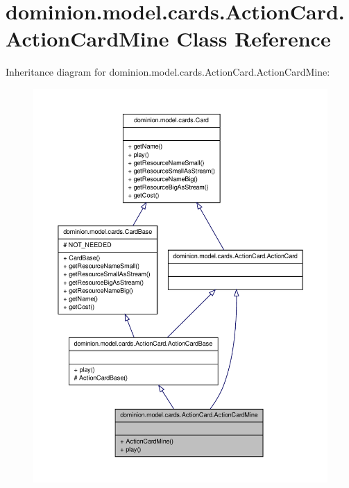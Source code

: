 \hypertarget{classdominion_1_1model_1_1cards_1_1ActionCard_1_1ActionCardMine}{\section{dominion.\-model.\-cards.\-Action\-Card.\-Action\-Card\-Mine \-Class \-Reference}
\label{classdominion_1_1model_1_1cards_1_1ActionCard_1_1ActionCardMine}
}


\-Inheritance diagram for dominion.\-model.\-cards.\-Action\-Card.\-Action\-Card\-Mine\-:
\nopagebreak
\begin{figure}[H]
\begin{center}
\leavevmode
\includegraphics[width=350pt]{classdominion_1_1model_1_1cards_1_1ActionCard_1_1ActionCardMine__inherit__graph}
\end{center}
\end{figure}


